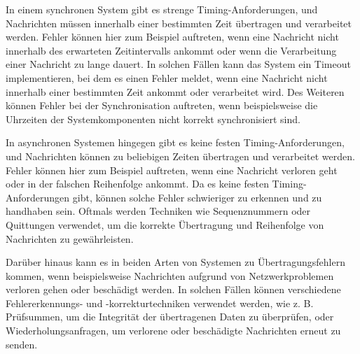 \documentclass[../vs-script-first-v01.tex]{subfiles}
\begin{document}
In einem synchronen System gibt es strenge Timing-Anforderungen, und Nachrichten müssen innerhalb einer bestimmten Zeit übertragen und verarbeitet werden. Fehler können hier zum Beispiel auftreten, wenn eine Nachricht nicht innerhalb des erwarteten Zeitintervalls ankommt oder wenn die Verarbeitung einer Nachricht zu lange dauert. In solchen Fällen kann das System ein Timeout implementieren, bei dem es einen Fehler meldet, wenn eine Nachricht nicht innerhalb einer bestimmten Zeit ankommt oder verarbeitet wird. Des Weiteren können Fehler bei der Synchronisation auftreten, wenn beispielsweise die Uhrzeiten der Systemkomponenten nicht korrekt synchronisiert sind.

In asynchronen Systemen hingegen gibt es keine festen Timing-Anforderungen, und Nachrichten können zu beliebigen Zeiten übertragen und verarbeitet werden. Fehler können hier zum Beispiel auftreten, wenn eine Nachricht verloren geht oder in der falschen Reihenfolge ankommt. Da es keine festen Timing-Anforderungen gibt, können solche Fehler schwieriger zu erkennen und zu handhaben sein. Oftmals werden Techniken wie Sequenznummern oder Quittungen verwendet, um die korrekte Übertragung und Reihenfolge von Nachrichten zu gewährleisten.

Darüber hinaus kann es in beiden Arten von Systemen zu Übertragungsfehlern kommen, wenn beispielsweise Nachrichten aufgrund von Netzwerkproblemen verloren gehen oder beschädigt werden. In solchen Fällen können verschiedene Fehlererkennungs- und -korrekturtechniken verwendet werden, wie z. B. Prüfsummen, um die Integrität der übertragenen Daten zu überprüfen, oder Wiederholungsanfragen, um verlorene oder beschädigte Nachrichten erneut zu senden.
\end{document}

